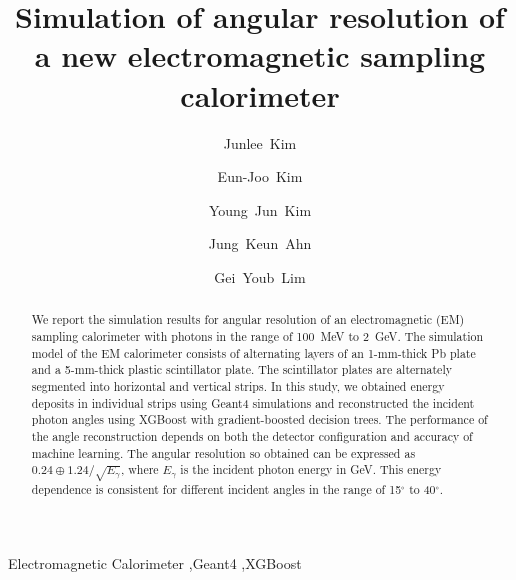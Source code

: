 \documentclass[preprint,12pt,times,a4paper]{elsarticle}
\begin{document}
\begin{frontmatter}

\setcounter{page}{0}
\title{Simulation of angular resolution of a new electromagnetic sampling calorimeter}

\author[jbnu]{Junlee~Kim}

\author[jbnu]{Eun-Joo~Kim}

\author[korea]{Young~Jun~Kim}
\author[korea]{Jung~Keun~Ahn}
\author[kek]{Gei~Youb~Lim}

\address[jbnu]{Division of Science Education, Jeonbuk National University, Jeonju 54896, Korea}
\address[korea]{Department of Physics, Korea University, Seoul 02841, Korea}
\address[kek]{Institute of Particle and Nuclear Studies (IPNS), High Energy Accelerator Research Organization (KEK), Tsukuba 305-0801, Japan}


\begin{abstract}
We report the simulation results for angular resolution of an electromagnetic (EM) sampling calorimeter with photons in the range of 100~MeV to 2~GeV. The simulation model of the EM calorimeter consists of alternating layers of an 1-mm-thick Pb plate and a 5-mm-thick plastic scintillator plate. The scintillator plates are alternately segmented into horizontal and vertical strips. In this study, we obtained energy deposits in individual strips using Geant4 simulations and reconstructed the incident photon angles using XGBoost with gradient-boosted decision trees. The performance of the angle reconstruction depends on both the detector configuration and accuracy of machine learning. The angular resolution so obtained can be expressed as $0.24 \oplus 1.24/\sqrt{E_{\gamma}}$, where $E_{\gamma}$ is the incident photon energy in GeV. This energy dependence is consistent for different incident angles 
in the range of 15$^{\circ}$ to 40$^{\circ}$.

\end{abstract}
\begin{keyword}
Electromagnetic Calorimeter \sep Geant4 \sep XGBoost
\end{keyword}

\end{frontmatter}
\end{document}

